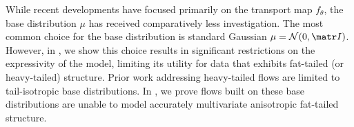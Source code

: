 \documentclass[nohyperref]{article}
\theoremstyle{plain}
\theoremstyle{definition}
\theoremstyle{remark}
\begin{document}
While recent developments \citep{chen2019residual,huang2018neural,durkan2019neural} have focused primarily
on the transport map $f_\theta$, the base distribution $\mu$ has received comparatively less investigation. 
The most common choice for the base distribution is standard Gaussian $\mu = \cN(0,\mI)$.
However, in , we show this choice results in significant
restrictions on the expressivity of the model, limiting its utility for data that
exhibits fat-tailed (or heavy-tailed) structure.
Prior work addressing heavy-tailed flows \citep{jaini2020tails}
are limited to tail-isotropic base distributions.
In , we prove flows built on these base distributions
are unable to model accurately multivariate anisotropic fat-tailed structure.
\end{document}
